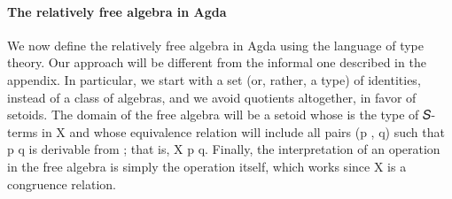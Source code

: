 \paragraph*{The relatively free algebra in Agda}
We now define the relatively free algebra in Agda using the language of type theory.
Our approach will be different from the informal one described in the appendix.
In particular, we start with a set (or, rather, a type)  of identities, instead of a
class of algebras, and we avoid quotients altogether, in favor of setoids. The domain of
the free algebra will be a setoid whose  is the type  of {𝑆}-terms
in \ab X and whose equivalence relation will include all pairs (\ab p , \ab q) 
   such that \ab p  \ab q is derivable from ; that is,
  \ab X  \ab p  \ab q. Finally, the interpretation of an
operation in the free algebra is simply the operation itself, which works since 
 \ab X  is a congruence relation.

